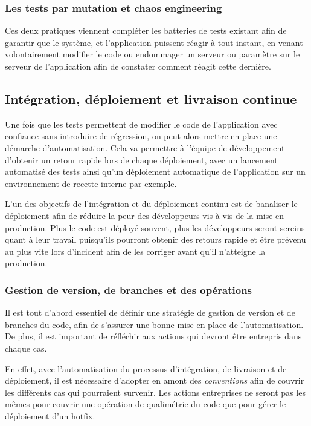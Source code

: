 \subsubsection{Les tests par mutation et chaos engineering}


Ces deux pratiques viennent compléter les batteries de tests existant afin de garantir que le système, et l'application puissent réagir à tout instant, en venant volontairement modifier le code ou endommager un serveur ou paramètre sur le serveur de l'application afin de constater comment réagit cette dernière.

\subsection{Intégration, déploiement et livraison continue}

Une fois que les tests permettent de modifier le code de l'application avec confiance sans introduire de régression, on peut alors mettre en place une démarche d'automatisation. Cela va permettre à l'équipe de développement d'obtenir un retour rapide lors de chaque déploiement, avec un lancement automatisé des tests ainsi qu'un déploiement automatique de l'application sur un environnement de recette interne par exemple.

L'un des objectifs de l'intégration et du déploiement continu est de banaliser le déploiement afin de réduire la peur des développeurs vis-à-vis de la mise en production. Plus le code est déployé souvent, plus les développeurs seront sereins quant à leur travail puisqu'ils pourront obtenir des retours rapide et être prévenu au plus vite lors d'incident afin de les corriger avant qu'il n'atteigne la production.

\subsubsection{Gestion de version, de branches et des opérations}


Il est tout d'abord essentiel de définir une stratégie de gestion de version et de branches du code, afin de s'assurer une bonne mise en place de l'automatisation. De plus, il est important de réfléchir aux actions qui devront être entrepris dans chaque cas. 

En effet, avec l'automatisation du processus d'intégration, de livraison et de déploiement, il est nécessaire d'adopter en amont des \emph{conventions} afin de couvrir les différents cas qui pourraient survenir. Les actions entreprises ne seront pas les mêmes pour couvrir une opération de qualimétrie du code que pour gérer le déploiement d'un \gls{hotfix}.


